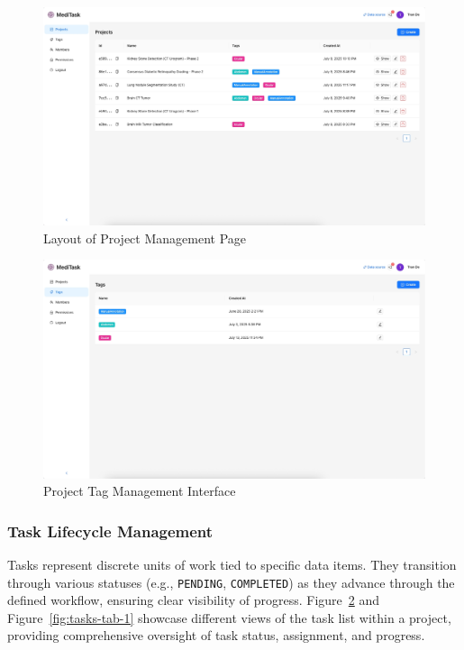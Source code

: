 \begin{figure}[h!]
    \centering
    \includegraphics[width=1\textwidth]{content//resources//features//projects.png}
    \caption{Layout of Project Management Page}
    \label{fig:project-list}
\end{figure}

\begin{figure}[h!]
    \centering
    \includegraphics[width=1\textwidth]{content//resources//features//tags.png}
    \caption{Project Tag Management Interface}
    \label{fig:tags-list}
\end{figure}

\subsubsection{Task Lifecycle Management}
Tasks represent discrete units of work tied to specific data items. They transition through various statuses (e.g., \texttt{PENDING}, \texttt{COMPLETED}) as they advance through the defined workflow, ensuring clear visibility of progress. Figure~\ref{fig:tags-list} and Figure~\ref{fig:tasks-tab-1} showcase different views of the task list within a project, providing comprehensive oversight of task status, assignment, and progress.

